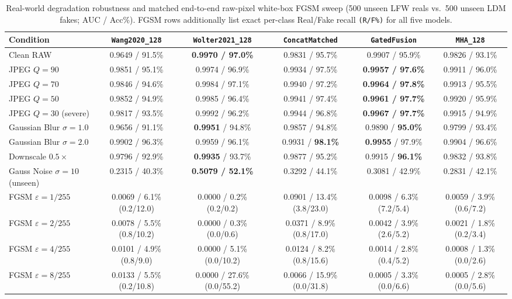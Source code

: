 \documentclass[fleqn,10pt]{wlscirep}
\begin{document}
\begin{table}[tbp]
\centering
\caption{Real-world degradation robustness and matched end-to-end raw-pixel white-box FGSM sweep (500 unseen LFW reals vs.\ 500 unseen LDM fakes; AUC / Acc\%). FGSM rows additionally list exact per-class Real/Fake recall \texttt{(R/F\%)} for all five models.}
\label{tab:robustness}
\scriptsize
\begin{tabular}{@{}lccccc@{}}
\toprule
\textbf{Condition} & \textbf{\texttt{Wang2020\_128}} & \textbf{\texttt{Wolter2021\_128}} & \textbf{\texttt{ConcatMatched}} & \textbf{\texttt{GatedFusion}} & \textbf{\texttt{MHA\_128}} \\
\midrule
Clean RAW & 0.9649 / 91.5\% & \textbf{0.9970 / 97.0\%} & 0.9831 / 95.7\% & 0.9907 / 95.9\% & 0.9826 / 93.1\% \\
JPEG $Q=90$ & 0.9851 / 95.1\% & 0.9974 / 96.9\% & 0.9934 / 97.5\% & \textbf{0.9957 / 97.6\%} & 0.9911 / 96.0\% \\
JPEG $Q=70$ & 0.9846 / 94.6\% & 0.9984 / 97.1\% & 0.9940 / 97.2\% & \textbf{0.9964 / 97.8\%} & 0.9913 / 95.5\% \\
JPEG $Q=50$ & 0.9852 / 94.9\% & 0.9985 / 96.4\% & 0.9941 / 97.4\% & \textbf{0.9961 / 97.7\%} & 0.9920 / 95.9\% \\
JPEG $Q=30$ (severe) & 0.9817 / 93.5\% & 0.9992 / 96.2\% & 0.9944 / 96.8\% & \textbf{0.9967 / 97.7\%} & 0.9915 / 94.9\% \\
Gaussian Blur $\sigma=1.0$ & 0.9656 / 91.1\% & \textbf{0.9951} / 94.8\% & 0.9857 / 94.8\% & 0.9890 / \textbf{95.0\%} & 0.9799 / 93.4\% \\
Gaussian Blur $\sigma=2.0$ & 0.9902 / 96.3\% & 0.9959 / 96.1\% & 0.9931 / \textbf{98.1\%} & \textbf{0.9955} / 97.9\% & 0.9904 / 96.6\% \\
Downscale $0.5\times$ & 0.9796 / 92.9\% & \textbf{0.9935} / 93.7\% & 0.9877 / 95.2\% & 0.9915 / \textbf{96.1\%} & 0.9832 / 93.8\% \\
Gauss Noise $\sigma=10$ (unseen) & 0.2315 / 40.3\% & \textbf{0.5079 / 52.1\%} & 0.3292 / 44.1\% & 0.3081 / 42.9\% & 0.2831 / 42.1\% \\
\midrule
FGSM $\varepsilon = 1/255$ & 0.0069 / 6.1\% (0.2/12.0) & 0.0000 / 0.2\% (0.2/0.2) & 0.0901 / 13.4\% (3.8/23.0) & 0.0098 / 6.3\% (7.2/5.4) & 0.0059 / 3.9\% (0.6/7.2) \\
FGSM $\varepsilon = 2/255$ & 0.0078 / 5.5\% (0.8/10.2) & 0.0000 / 0.3\% (0.0/0.6) & 0.0371 / 8.9\% (0.8/17.0) & 0.0042 / 3.9\% (2.6/5.2) & 0.0021 / 1.8\% (0.2/3.4) \\
FGSM $\varepsilon = 4/255$ & 0.0101 / 4.9\% (0.8/9.0) & 0.0000 / 5.1\% (0.0/10.2) & 0.0124 / 8.2\% (0.8/15.6) & 0.0014 / 2.8\% (0.4/5.2) & 0.0008 / 1.3\% (0.0/2.6) \\
FGSM $\varepsilon = 8/255$ & 0.0133 / 5.5\% (0.2/10.8) & 0.0000 / 27.6\% (0.0/55.2) & 0.0066 / 15.9\% (0.0/31.8) & 0.0005 / 3.3\% (0.0/6.6) & 0.0005 / 2.8\% (0.0/5.6) \\
\bottomrule
\end{tabular}
\end{table}
\end{document}
